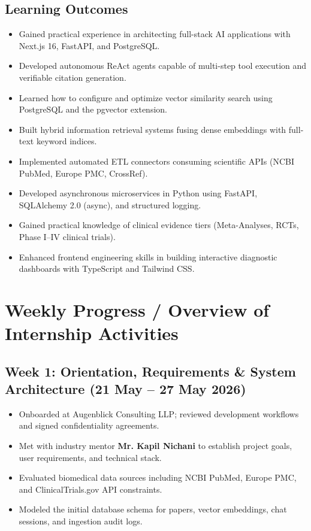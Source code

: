 \documentclass[11pt,a4paper]{article}
\begin{document}
\subsection{Learning Outcomes}
\begin{itemize}[leftmargin=*,noitemsep]
    \item Gained practical experience in architecting full-stack AI applications with Next.js 16, FastAPI, and PostgreSQL.
    \item Developed autonomous ReAct agents capable of multi-step tool execution and verifiable citation generation.
    \item Learned how to configure and optimize vector similarity search using PostgreSQL and the pgvector extension.
    \item Built hybrid information retrieval systems fusing dense embeddings with full-text keyword indices.
    \item Implemented automated ETL connectors consuming scientific APIs (NCBI PubMed, Europe PMC, CrossRef).
    \item Developed asynchronous microservices in Python using FastAPI, SQLAlchemy 2.0 (async), and structured logging.
    \item Gained practical knowledge of clinical evidence tiers (Meta-Analyses, RCTs, Phase I--IV clinical trials).
    \item Enhanced frontend engineering skills in building interactive diagnostic dashboards with TypeScript and Tailwind CSS.
\end{itemize}

\section{Weekly Progress / Overview of Internship Activities}

\subsection*{Week 1: Orientation, Requirements \& System Architecture (21 May -- 27 May 2026)}
\begin{itemize}[leftmargin=*,noitemsep]
    \item Onboarded at Augenblick Consulting LLP; reviewed development workflows and signed confidentiality agreements.
    \item Met with industry mentor \textbf{Mr. Kapil Nichani} to establish project goals, user requirements, and technical stack.
    \item Evaluated biomedical data sources including NCBI PubMed, Europe PMC, and ClinicalTrials.gov API constraints.
    \item Modeled the initial database schema for papers, vector embeddings, chat sessions, and ingestion audit logs.
\end{itemize}
\end{document}
